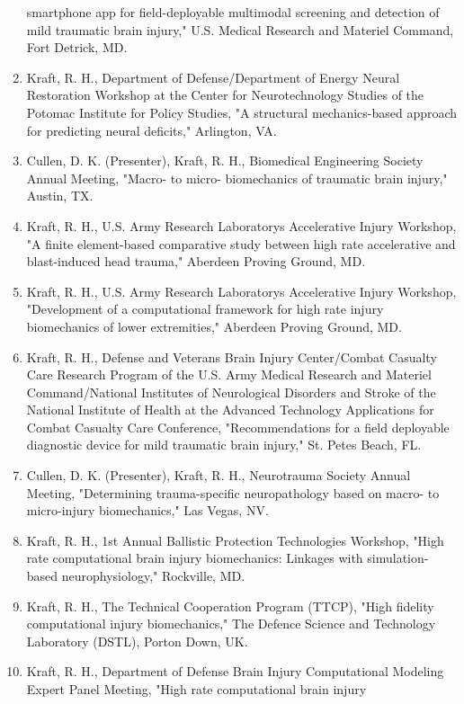 \documentclass[
]{article}
\begin{document}
\begin{enumerate}
  smartphone app for field-deployable multimodal screening and detection
  of mild traumatic brain injury," U.S. Medical Research and Materiel
  Command, Fort Detrick, MD.
\item
  Kraft, R. H., Department of Defense/Department of Energy Neural
  Restoration Workshop at the Center for Neurotechnology Studies of the
  Potomac Institute for Policy Studies, "A structural mechanics-based
  approach for predicting neural deficits," Arlington, VA.
\item
  Cullen, D. K. (Presenter), Kraft, R. H., Biomedical Engineering
  Society Annual Meeting, "Macro- to micro- biomechanics of traumatic
  brain injury," Austin, TX.
\item
  Kraft, R. H., U.S. Army Research Laboratory\textquotesingle s
  Accelerative Injury Workshop, "A finite element-based comparative
  study between high rate accelerative and blast-induced head trauma,"
  Aberdeen Proving Ground, MD.
\item
  Kraft, R. H., U.S. Army Research Laboratory\textquotesingle s
  Accelerative Injury Workshop, "Development of a computational
  framework for high rate injury biomechanics of lower extremities,"
  Aberdeen Proving Ground, MD.
\item
  Kraft, R. H., Defense and Veterans Brain Injury Center/Combat Casualty
  Care Research Program of the U.S. Army Medical Research and Materiel
  Command/National Institutes of Neurological Disorders and Stroke of
  the National Institute of Health at the Advanced Technology
  Applications for Combat Casualty Care Conference, "Recommendations for
  a field deployable diagnostic device for mild traumatic brain injury,"
  St. Pete\textquotesingle s Beach, FL.
\item
  Cullen, D. K. (Presenter), Kraft, R. H., Neurotrauma Society Annual
  Meeting, "Determining trauma-specific neuropathology based on macro-
  to micro-injury biomechanics," Las Vegas, NV.
\item
  Kraft, R. H., 1st Annual Ballistic Protection Technologies Workshop,
  "High rate computational brain injury biomechanics: Linkages with
  simulation-based neurophysiology," Rockville, MD.
\item
  Kraft, R. H., The Technical Cooperation Program (TTCP), "High fidelity
  computational injury biomechanics," The Defence Science and Technology
  Laboratory (DSTL), Porton Down, UK.
\item
  Kraft, R. H., Department of Defense Brain Injury Computational
  Modeling Expert Panel Meeting, "High rate computational brain injury

\end{enumerate}
\end{document}
